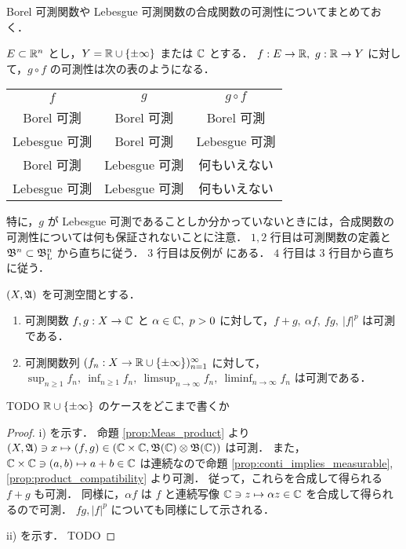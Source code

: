 \begin{remark}
    Borel 可測関数や Lebesgue 可測関数の合成関数の可測性についてまとめておく．

    $E\subset\mathbb{R}^n$ とし，$Y=\mathbb{R}\cup\{\pm\infty\}$ または $\mathbb{C}$ とする．
    $f:E\to\mathbb{R},\ g:\mathbb{R}\to Y$ に対して，$g\circ f$ の可測性は次の表のようになる．

    \begin{table}[h]
        \centering
        \begin{tabular}{|c|c||c|}
            \hline
            $f$ & $g$ & $g\circ f$\\
            \hhline{|=|=#=|}
            Borel 可測 & Borel 可測 & Borel 可測\\
            \hline
            Lebesgue 可測 & Borel 可測 & Lebesgue 可測\\
            \hline
            Borel 可測 & Lebesgue 可測 & 何もいえない\\
            \hline
            Lebesgue 可測 & Lebesgue 可測 & 何もいえない\\
            \hline
        \end{tabular}
    \end{table}

    特に，$g$ が Lebesgue 可測であることしか分かっていないときには，合成関数の可測性については何も保証されないことに注意．
    $1,2$ 行目は可測関数の定義と $\mathfrak{B}^n\subset\mathfrak{B}_{\mathrm{L}}^n$ から直ちに従う．
    $3$ 行目は反例が \cite[\S2 Exercise 9]{Fo99}\cite[pp.72--73]{It63} にある．
    $4$ 行目は $3$ 行目から直ちに従う．
\end{remark}

\begin{theorem}\label{thm:elementary_measuable_functions}
    $(X,\mathfrak{A})$ を可測空間とする．
    \begin{enumerate}
        \item 可測関数 $f,g:X\to\mathbb{C}$ と $\alpha\in\mathbb{C},\ p>0$ に対して，$f+g,\ \alpha f,\ fg,\ |f|^p$ は可測である．
        \item 可測関数列 $(f_n:X\to\mathbb{R}\cup\{\pm\infty\})_{n=1}^\infty$ に対して，
            $\displaystyle\sup_{n\ge1}f_n,\ \inf_{n\ge1}f_n,\ \limsup_{n\to\infty}f_n,\ \liminf_{n\to\infty}f_n$ は可測である．
    \end{enumerate}
    {\color{red} TODO $\mathbb{R}\cup\{\pm\infty\}$ のケースをどこまで書くか}
\end{theorem}

\begin{proof}
    \textrm{i)} を示す．
    命題 \ref{prop:Meas_product} より $(X,\mathfrak{A})\ni x\mapsto(f,g)\in(\mathbb{C}\times\mathbb{C},\mathfrak{B}(\mathbb{C})\otimes\mathfrak{B}(\mathbb{C}))$ は可測．
    また，$\mathbb{C}\times\mathbb{C}\ni(a,b)\mapsto a+b\in\mathbb{C}$ は連続なので命題 \ref{prop:conti_implies_measurable}, \ref{prop:product_compatibility} より可測．
    従って，これらを合成して得られる $f+g$ も可測．
    同様に，$\alpha f$ は $f$ と連続写像 $\mathbb{C}\ni z\mapsto\alpha z\in\mathbb{C}$ を合成して得られるので可測．
    $fg,|f|^p$ についても同様にして示される．

    \textrm{ii)} を示す．
    {\color{red} TODO}
\end{proof}

